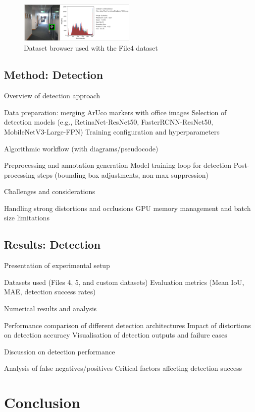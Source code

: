 \documentclass[conference]{IEEEtran}
\begin{document}
\begin{figure}[h]
  \centering
  \includegraphics[width=0.5\textwidth]{images/aruco-dataset-browser-2.png}
  \caption{Dataset browser used with the File4 dataset}
  \label{fig:data_browser_2}
\end{figure}


\subsection{Method: Detection}

Overview of detection approach

Data preparation: merging ArUco markers with office images
Selection of detection models (e.g., RetinaNet-ResNet50, FasterRCNN-ResNet50, MobileNetV3-Large-FPN)
Training configuration and hyperparameters

Algorithmic workflow (with diagrams/pseudocode)

Preprocessing and annotation generation
Model training loop for detection
Post-processing steps (bounding box adjustments, non-max suppression)

Challenges and considerations

Handling strong distortions and occlusions
GPU memory management and batch size limitations

\subsection{Results: Detection}

Presentation of experimental setup

Datasets used (Files 4, 5, and custom datasets)
Evaluation metrics (Mean IoU, MAE, detection success rates)

Numerical results and analysis

Performance comparison of different detection architectures
Impact of distortions on detection accuracy
Visualisation of detection outputs and failure cases

Discussion on detection performance

Analysis of false negatives/positives
Critical factors affecting detection success

\section{Conclusion}
\end{document}

